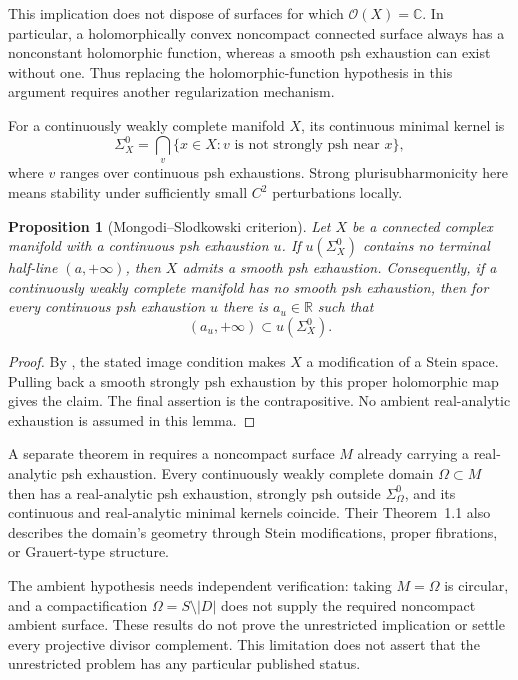 \documentclass[11pt]{amsart}
\newtheorem{proposition}[theorem]{Proposition}
\theoremstyle{definition}
\theoremstyle{remark}
\numberwithin{equation}{section}
\newcommand{\C}{\mathbb C}
\newcommand{\R}{\mathbb R}
\newcommand{\OO}{\mathcal O}
\begin{document}
This implication does not dispose of surfaces for which
$\OO(X)=\C$. In particular, a holomorphically convex noncompact
connected surface always has a nonconstant holomorphic function, whereas
a smooth psh exhaustion can exist without one. Thus replacing the
holomorphic-function hypothesis in this argument requires another
regularization mechanism.


For a continuously weakly complete manifold $X$, its continuous minimal
kernel is
\[
 \Sigma_X^0=\bigcap_v\{x\in X:
       v\text{ is not strongly psh near }x\},
\]
where $v$ ranges over continuous psh exhaustions. Strong
plurisubharmonicity here means stability under sufficiently small
$C^2$ perturbations locally.

\begin{proposition}[Mongodi--Slodkowski criterion]
\label{prop:surface-minimal-kernel}
Let $X$ be a connected complex manifold with a continuous psh exhaustion
$u$. If $u(\Sigma_X^0)$ contains no terminal half-line $(a,+\infty)$,
then $X$ admits a smooth psh exhaustion.
Consequently, if a continuously weakly complete manifold has no smooth
psh exhaustion, then for every continuous psh exhaustion $u$ there is
$a_u\in\R$ such that
\[
 (a_u,+\infty)\subset u(\Sigma_X^0).
\]
\end{proposition}
\begin{proof}
By \cite[Lemma~2.1]{MongodiSlodkowski2020}, the stated image condition
makes $X$ a modification of a Stein space. Pulling back a smooth
strongly psh exhaustion by this proper holomorphic map gives the
claim. The final assertion is the contrapositive. No ambient
real-analytic exhaustion is assumed in this lemma.
\end{proof}

A separate theorem in \cite[Corollaries~4.4--4.5]{MongodiSlodkowski2020}
requires a noncompact surface $M$ already carrying a real-analytic psh
exhaustion. Every continuously weakly complete domain $\Omega\subset M$
then has a real-analytic psh exhaustion, strongly psh outside
$\Sigma_\Omega^0$, and its continuous and real-analytic minimal kernels
coincide. Their Theorem~1.1 also describes the domain's geometry through
Stein modifications, proper fibrations, or Grauert-type structure.

The ambient hypothesis needs independent verification: taking
$M=\Omega$ is circular, and a compactification
$\Omega=S\setminus|D|$ does not supply the required noncompact ambient
surface. These results do not prove the unrestricted implication
or settle every projective divisor complement. This limitation does not
assert that the unrestricted problem has any particular published status.
\end{document}
